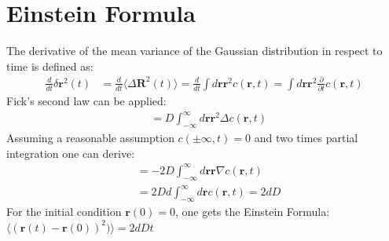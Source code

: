\documentclass[
  a4paper,BCOR10mm,oneside,
  headsepline,footsepline,%
  fleqn,openbib
]{scrbook}
\begin{document}
\section{Einstein Formula} \label{einsteinrealtionappendix}
The derivative of the mean variance of the Gaussian distribution in respect to time is defined as:
\begin{align}
 \frac{d}{dt}  \delta \bm{r}^2(t)&=\frac{d}{dt} \langle \Delta \bm{ R}^2(t)\rangle  =\frac{d}{dt} \int d\bm{r} \bm{r}^2 c(\bm{r},t)=\int d\bm{r} \bm{r}^2 \frac{\partial}{\partial t} c(\bm{r},t) 
\end{align}
Fick's second law can be applied:
\begin{align}
&= D \int_{-\infty}^{\infty}d\bm{r} \bm{r}^2 \Delta c(\bm{r},t)  
\end{align}
Assuming a reasonable assumption  $c(\pm \infty,t)=0$  and two times partial integration one can derive:
\begin{align}
&= -2 D \int_{-\infty}^{\infty} d\bm{r} \bm{r} \nabla c(\bm{r},t) \\ &= 2 D d \int_{-\infty}^{\infty} d\bm{r} c(\bm{r},t) =2dD
\end{align}
For the initial condition $\bm{r}(0) = 0$,  one gets the Einstein Formula: $\langle (\bm{r}(t)-\bm{r}(0))^2)\rangle= 2dDt$
\end{document}
